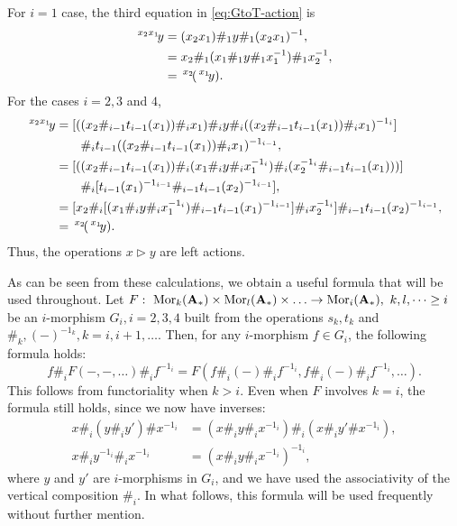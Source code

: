 \documentclass[11pt, reqno]{amsart} %
\newcommand{\act}[1]{\,\sp{#1}\!}
\newcommand{\mor}{{\mathop{\mathrm{Mor}}}}
\theoremstyle{definition}
\theoremstyle{remark}
\numberwithin{equation}{section}
\begin{document}
For $i=1$ case, the third equation in \eqref{eq:GtoT-action} is
\begin{align*}
  \act{x_2x_1}y &= (x_2x_1)\#_1y\#_1(x_2x_1)^{-1}, \\
  &= x_2\#_1(x_1\#_1y\#_1x_1^{-1})\#_1x_2^{-1}, \\
  &= \act{x_2}(\act{x_1}y).
\end{align*}
For the cases $i=2,3$ and $4$,
\begin{align*} 
  \act{x_2x_1}y &= 
  [
    ((x_2\#_{i-1}t_{i-1}(x_1))\#_ix_1)
    \#_i
    y
    \#_i
    ((x_2\#_{i-1}t_{i-1}(x_1))\#_ix_1)^{-1_i}
  ] \\
  &\qquad 
  \#_it_{i-1}((x_2\#_{i-1}t_{i-1}(x_1))\#_ix_1)^{-1_{i-1}}, \\
  &= 
  [
    ((x_2\#_{i-1}t_{i-1}(x_1))
    \#_i
    (x_1\#_iy\#_ix_1^{-1_i})
    \#_i
    (x_2^{-1_i}\#_{i-1}t_{i-1}(x_1)))
  ] \\
  &\qquad 
  \#_i[t_{i-1}(x_1)^{-1_{i-1}}\#_{i-1}t_{i-1}(x_2)^{-1_{i-1}}], \\
  &= 
  [
    x_2
    \#_i
    [(x_1\#_iy\#_ix_1^{-1_i})\#_{i-1}t_{i-1}(x_1)^{-1_{i-1}}]
    \#_i
    x_2^{-1_i}
  ]\#_{i-1}t_{i-1}(x_2)^{-1_{i-1}}, \\
  &= \act{x_2}(\act{x_1}y).
\end{align*}
Thus, the operations $x\triangleright y$ are left actions. 

As can be seen from these calculations, we obtain a useful formula that will be used throughout. Let $F:~\mor_k({\bf A}_*)\times \mor_l({\bf A}_*)\times \ldots \to \mor_i({\bf A}_*),~k,l,\cdots \geq i$ be an $i$-morphism $G_i,i=2,3,4$ built from the operations $s_k,t_k$ and $\#_k,(-)^{-1_k},k=i,i+1,\ldots$. Then, for any $i$-morphism $f\in G_i$, the following formula holds:
\[
  f\#_iF(-,-,\ldots)\#_if^{-1_i} = F(f\#_i(-)\#_if^{-1_i},f\#_i(-)\#_if^{-1_i},\ldots).
\]
This follows from functoriality when $k>i$. Even when $F$ involves $k=i$, the formula still holds, since we now have inverses:
\begin{align*}
  x\#_i(y\#_iy')\#x^{-1_i} &= (x\#_iy\#_ix^{-1_i})\#_i(x\#_iy'\#x^{-1_i}), \\
  x\#_iy^{-1_i}\#_ix^{-1_i} &= (x\#_iy\#_ix^{-1_i})^{-1_i},
\end{align*}
where $y$ and $y'$ are $i$-morphisms in $G_i$, and we have used the associativity of the vertical composition $\#_i$. In what follows, this formula will be used frequently without further mention.
\end{document}
